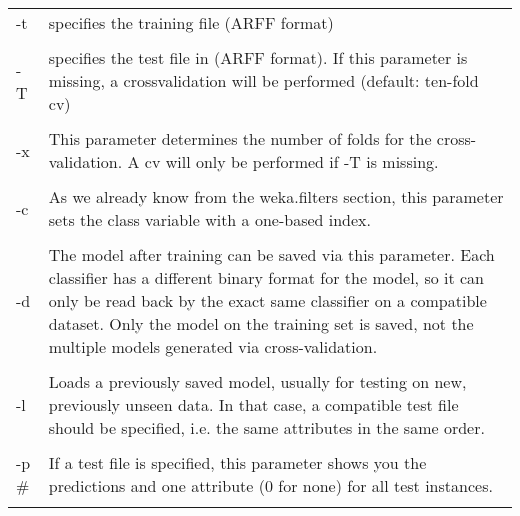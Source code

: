 \vspace{0.5cm}
\noindent
\begin{tabular}{l l}
-t 
& 
\begin{minipage}{10cm}
specifies the training file (ARFF format) 
\end{minipage}
\\
\\

-T 
& 
\begin{minipage}{10cm}
specifies the test file in (ARFF format). If this parameter is missing, a crossvalidation will be performed (default: ten-fold cv) 
\end{minipage}
\\
\\

-x 
& 
\begin{minipage}{10cm}
This parameter determines the number of folds for the cross-validation. A cv will only be performed if -T is missing. 
\end{minipage}
\\
\\

-c 
& 
\begin{minipage}{10cm}
As we already know from the weka.filters section, this parameter sets the class variable with a one-based index. 
\end{minipage}
\\
\\

-d 
& 
\begin{minipage}{10cm}
The model after training can be saved via this parameter. Each classifier has a different binary format for the model, so it can only be read back by the exact same classifier on a compatible dataset. Only the model on the training set is saved, not the multiple models generated via cross-validation. 
\end{minipage}
\\
\\

-l 
& 
\begin{minipage}{10cm}
Loads a previously saved model, usually for testing on new, previously unseen data. In that case, a compatible test file should be specified, i.e. the same attributes in the same order. 
\end{minipage}
\\
\\

-p \# 
& 
\begin{minipage}{10cm}
If a test file is specified, this parameter shows you the predictions and one attribute (0 for none) for all test instances. 
\end{minipage}
\\
\\


\end{tabular}
